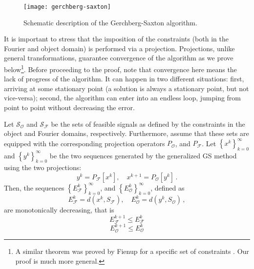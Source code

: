 \begin{figure}[H]
  \centering
  \texttt{[image: gerchberg-saxton]}
  \caption{Schematic description of the Gerchberg-Saxton algorithm.}
\label{fig:current-gs-method}
\end{figure}
It is important to stress that the imposition of the constraints (both
in the Fourier and object domain) is performed via a
projection. Projections, unlike general transformations, guarantee
convergence of the algorithm as we prove below\footnote{A similar
  theorem was proved by Fienup for a specific set of constraints
  . Our proof is much more general.}. Before
proceeding to the proof, note that convergence here means the lack of
progress of the algorithm.  It can happen in two different situations:
first, arriving at some stationary point (a solution is always a
stationary point, but not vice-versa); second, the algorithm can enter
into an endless loop, jumping from point to point without decreasing
the error.
\begin{thm}
  \label{thm:alternating-projections}
  Let $\mathcal{S}_{\mathcal{O}}$ and $\mathcal{S_{\mathcal{F}}}$ be
  the sets of feasible signals as defined by the constraints in the
  object and Fourier domains, respectively. Furthermore, assume
  that these sets are equipped with the corresponding  projection
  operators $P_{\mathcal{O}}$, and $P_{\mathcal{F}}$. Let
  $\left\{x^{k}\right\}_{k=0}^{\infty}$ and
  $\left\{y^{k}\right\}_{k=0}^{\infty}$ be the two sequences generated
  by the generalized GS method using the two projections:
  \begin{equation}
    \label{eq:current-4}
    y^{k} = P_{\mathcal{F}}[x^{k}], \quad
    x^{k+1}=P_{\mathcal{O}}[y^{k}]\,. 
  \end{equation}
  Then, the sequences
  $\left\{E_{\mathcal{F}}^{k}\right\}_{k=0}^{\infty}$, and
  $\left\{E_{\mathcal{O}}^{k}\right\}_{k=0}^{\infty}$, defined as
  \begin{equation}
    \label{eq:current-5}
    E_{\mathcal{F}}^{k} = d(x^{k}, S_\mathcal{F}),\quad
    E_{\mathcal{O}}^{k} = d(y^{k}, S_\mathcal{O})\,,
  \end{equation}
  are monotonically decreasing, that is
  \begin{equation}
    \label{eq:current-6}
    E_{\mathcal{F}}^{k+1} \leq E_{\mathcal{F}}^{k}
  \end{equation}
  \begin{equation}
    \label{eq:current-7}
    E_{\mathcal{O}}^{k+1} \leq E_{\mathcal{O}}^{k}
  \end{equation}
\end{thm}
